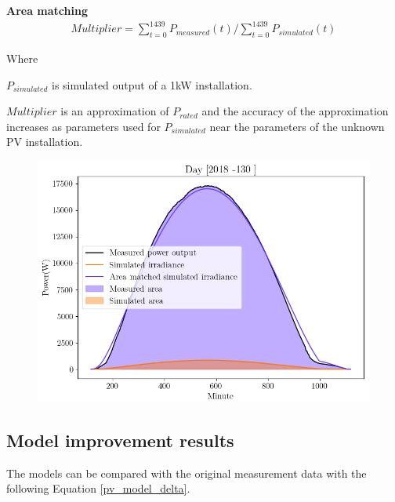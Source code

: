 

\noindent\textbf{Area matching}
\begin{equation}
\begin{split}
\label{pv_area_matching}
Multiplier = \sum_{t=0}^{1439} P_{measured}(t)/ \sum_{t=0}^{1439} P_{simulated}(t)
\end{split}
\end{equation}

\noindent Where

$P_{simulated}$ is simulated output of a 1kW installation.

$Multiplier$ is an approximation of $P_{rated}$ and the accuracy of the approximation increases as parameters used for $P_{simulated}$ near the parameters of the unknown PV installation.





\begin{figure}[h]
\centering
\includegraphics[width=0.7\linewidth]{pics/areamatching2}
\label{fig_area_match}
\end{figure}

\newpage
\subsection{Model improvement results}
The models can be compared with the original measurement data with the following Equation \ref{pv_model_delta}.



